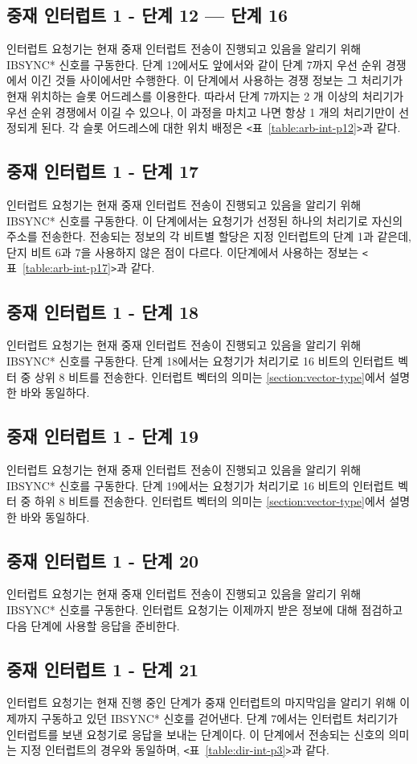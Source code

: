 \subsection*{중재 인터럽트 1 - 단계 12 --- 단계 16}
인터럽트 요청기는 현재 중재 인터럽트 전송이 진행되고 있음을 알리기 위해 IBSYNC* 신호를 구동한다.
단계 12에서도 앞에서와 같이 단계 7까지 우선 순위 경쟁에서 이긴 것들 사이에서만 수행한다.
이 단계에서 사용하는 경쟁 정보는 그 처리기가 현재 위치하는 슬롯 어드레스를 이용한다.
따라서 단계 7까지는 2 개 이상의 처리기가 우선 순위 경쟁에서 이길 수 있으나, 
이 과정을 마치고 나면 항상 1 개의 처리기만이 선정되게 된다.
각 슬롯 어드레스에 대한 위치 배정은 {\tt <}표~\ref{table:arb-int-p12}{\tt >}과 같다.

%
\subsection*{중재 인터럽트 1 - 단계 17}
인터럽트 요청기는 현재 중재 인터럽트 전송이 진행되고 있음을 알리기 위해 IBSYNC* 신호를 구동한다.
이 단계에서는 요청기가 선정된 하나의 처리기로 자신의 주소를 전송한다.
전송되는 정보의 각 비트별 할당은 지정 인터럽트의 단계 1과 같은데,
단지 비트 6과 7을 사용하지 않은 점이 다르다. 이단계에서 사용하는 정보는
{\tt <}표~\ref{table:arb-int-p17}{\tt >}과 같다.

%
\subsection*{중재 인터럽트 1 - 단계 18}
인터럽트 요청기는 현재 중재 인터럽트 전송이 진행되고 있음을 알리기 위해 IBSYNC* 신호를 구동한다.
단계 18에서는 요청기가 처리기로 16 비트의 인터럽트 벡터 중 상위 8 비트를 전송한다.
인터럽트 벡터의 의미는 \ref{section:vector-type}에서 설명한 바와 동일하다.

%
\subsection*{중재 인터럽트 1 - 단계 19}
인터럽트 요청기는 현재 중재 인터럽트 전송이 진행되고 있음을 알리기 위해 IBSYNC* 신호를 구동한다.
단계 19에서는 요청기가 처리기로 16 비트의 인터럽트 벡터 중 하위 8 비트를 전송한다.
인터럽트 벡터의 의미는 \ref{section:vector-type}에서 설명한 바와 동일하다.

%
\subsection*{중재 인터럽트 1 - 단계 20}
인터럽트 요청기는 현재 중재 인터럽트 전송이 진행되고 있음을 알리기 위해 IBSYNC* 신호를 구동한다.
인터럽트 요청기는 이제까지 받은 정보에 대해 점검하고 다음 단계에 사용할 응답을 준비한다.
%
\subsection*{중재 인터럽트 1 - 단계 21}
인터럽트 요청기는 현재 진행 중인 단계가 중재 인터럽트의 마지막임을 알리기 위해 이제까지
구동하고 있던 IBSYNC* 신호를 걷어낸다.
단계 7에서는 인터럽트 처리기가 인터럽트를 보낸 요청기로 응답을 보내는 단계이다.
이 단계에서 전송되는 신호의 의미는 지정 인터럽트의 경우와 동일하며,
{\tt <}표~\ref{table:dir-int-p3}{\tt >}과 같다.
